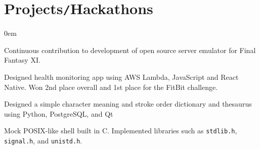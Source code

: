 \documentclass[10pt]{article}
\begin{document}
\vspace*{-10pt}
\section*{Projects\texttt{/}Hackathons}
\vspace*{-8pt}\hspace*{10pt}\begin{minipage}{0.93\textwidth}
    \begin{description}
        \itemsep0em
        \raggedright
        \item[AirSkyBoat \href{https://github.com/luke-belinc/AirSkyBoat}{\fontsize{9pt}{9pt}\faLink}] Continuous contribution to 
            development of open source server emulator for Final Fantasy XI.
        \item[DHack \href{https://github.com/kraudo/keepup}{\fontsize{9pt}{9pt}\faLink}] Designed health monitoring app using AWS 
            Lambda, JavaScript and React Native. Won 2nd place overall and 1st place for the FitBit challenge.
        \item[Chinese Character Dictionary \href{https://github.com/luke-belinc/chinese-char-dict}{\fontsize{9pt}{9pt}\faLink}] 
            Designed a simple character meaning and stroke order dictionary and thesaurus using Python, PostgreSQL, and Qt
        \item[Mock Shell \href{https://github.com/luke-belinc/c-fun}{\fontsize{9pt}{9pt}\faLink}] Mock POSIX-like shell built in C. Implemented libraries such as \texttt{stdlib.h}, \texttt{signal.h}, 
            and \texttt{unistd.h}.
    \end{description}
\end{minipage}
\end{document}

